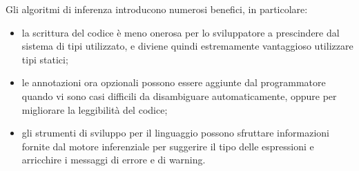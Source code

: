 \noindent Gli algoritmi di inferenza introducono numerosi benefici, in particolare:
\begin{itemize}
      \item la scrittura del codice è meno onerosa per lo sviluppatore a prescindere dal sistema di tipi utilizzato,
            e diviene quindi estremamente vantaggioso utilizzare tipi statici;
      \item le annotazioni ora opzionali possono essere aggiunte dal programmatore quando vi sono casi difficili
            da disambiguare automaticamente, oppure per migliorare la leggibilità del codice;
      \item gli strumenti di sviluppo per il linguaggio possono sfruttare informazioni fornite dal motore inferenziale
            per suggerire il tipo delle espressioni e arricchire i messaggi di errore e di warning.
\end{itemize}

\newpage



